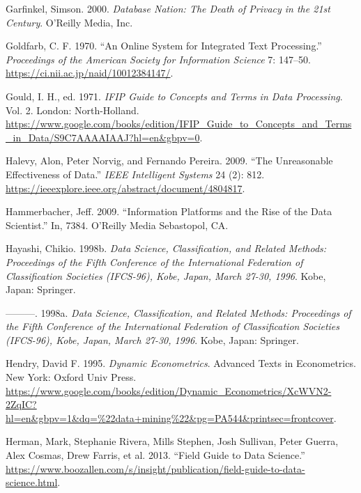\documentclass[
  letterpaper,
]{report}
\newlength{\cslhangindent}
\newlength{\cslentryspacingunit} %
\newenvironment{CSLReferences}[2] %
 {%
  \setlength{\parindent}{0pt}
  \ifodd #1
  \let\oldpar\par
  \def\par{\hangindent=\cslhangindent\oldpar}
  \fi
  \setlength{\parskip}{#2\cslentryspacingunit}
 }%
 {}
\begin{document}
\begin{CSLReferences}{1}{0}
\leavevmode{}%
Garfinkel, Simson. 2000. \emph{Database Nation: The Death of Privacy in
the 21st Century}. O'Reilly Media, Inc.

\leavevmode{}%
Goldfarb, C. F. 1970. {``An Online System for Integrated Text
Processing.''} \emph{Proceedings of the American Society for Information
Science} 7: 147--50. \url{https://ci.nii.ac.jp/naid/10012384147/}.

\leavevmode{}%
Gould, I. H., ed. 1971. \emph{IFIP Guide to Concepts and Terms in Data
Processing}. Vol. 2. London: North-Holland.
\url{https://www.google.com/books/edition/IFIP_Guide_to_Concepts_and_Terms_in_Data/S9C7AAAAIAAJ?hl=en\&gbpv=0}.

\leavevmode{}%
Halevy, Alon, Peter Norvig, and Fernando Pereira. 2009. {``The
Unreasonable Effectiveness of Data.''} \emph{IEEE Intelligent Systems}
24 (2): 812.
\url{https://ieeexplore.ieee.org/abstract/document/4804817}.

\leavevmode{}%
Hammerbacher, Jeff. 2009. {``Information Platforms and the Rise of the
Data Scientist.''} In, 7384. O'Reilly Media Sebastopol, CA.

\leavevmode{}%
Hayashi, Chikio. 1998b. \emph{Data Science, Classification, and Related
Methods: Proceedings of the Fifth Conference of the International
Federation of Classification Societies (IFCS-96), Kobe, Japan, March
27-30, 1996}. Kobe, Japan: Springer.

\leavevmode{}%
---------. 1998a. \emph{Data Science, Classification, and Related
Methods: Proceedings of the Fifth Conference of the International
Federation of Classification Societies (IFCS-96), Kobe, Japan, March
27-30, 1996}. Kobe, Japan: Springer.

\leavevmode{}%
Hendry, David F. 1995. \emph{Dynamic Econometrics}. Advanced Texts in
Econometrics. New York: Oxford Univ Press.
\url{https://www.google.com/books/edition/Dynamic_Econometrics/XcWVN2-2ZqIC?hl=en\&gbpv=1\&dq=\%22data+mining\%22\&pg=PA544\&printsec=frontcover}.

\leavevmode{}%
Herman, Mark, Stephanie Rivera, Mills Stephen, Josh Sullivan, Peter
Guerra, Alex Cosmas, Drew Farris, et al. 2013. {``Field Guide to Data
Science.''}
\url{https://www.boozallen.com/s/insight/publication/field-guide-to-data-science.html}.


\end{CSLReferences}
\end{document}
